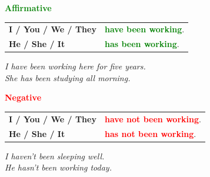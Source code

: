 \documentclass[a4paper,10pt]{article}
\newcommand{\sectiontitle}[2]{%
  {\large\bfseries\textcolor{#1}{#2}}%
}
\begin{document}
\begin{minipage}[t]{.485\textwidth}
\begin{greenbox}
  \sectiontitle{Green}{Affirmative}

  \vspace{0.75mm}
  \begin{tabular}{@{}>{\bfseries}l l@{}}
    I / You / We / They & \textcolor{Green}{\bfseries have been working}.\\
    He / She / It & \textcolor{Green}{\bfseries has been working}.
  \end{tabular}

  \vspace{0.75mm}
  \textit{I have been working here for five years.}\\[-1mm]
  \textit{She has been studying all morning.}
\end{greenbox}
\end{minipage}
\hfill
\begin{minipage}[t]{.485\textwidth}
\begin{redbox}
  \sectiontitle{Red}{Negative}

  \vspace{0.75mm}
  \begin{tabular}{@{}>{\bfseries}l l@{}}
    I / You / We / They & \textcolor{Red}{\bfseries have not been working}.\\
    He / She / It & \textcolor{Red}{\bfseries has not been working}.
  \end{tabular}

  \vspace{0.75mm}
  \textit{I haven't been sleeping well.}\\[-1mm]
  \textit{He hasn't been working today.}
\end{redbox}
\end{minipage}

\vspace{1.35mm}
\end{document}
